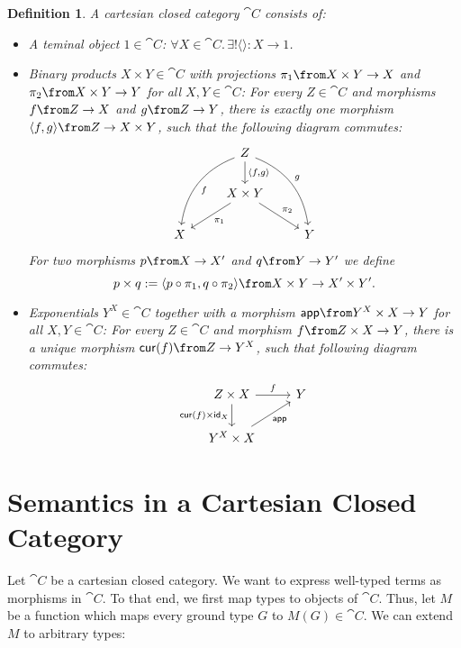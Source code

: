 \documentclass{article}
\newtheorem{defn}{Definition}[section]
\newcommand{\term}{1}
\newcommand{\app}{\mathsf{app}}
\newcommand{\cur}{\mathsf{cur}}
\newcommand{\id}{\mathsf{id}}
\begin{document}
\begin{defn}
    \label{def:ccc}
    A cartesian closed category $\cat{C}$ consists of:
    \begin{itemize}
        \item A teminal object $\term \in \cat{C}$: $\forall X \in \cat{C}.\, \exists! \langle\rangle: X \to \term$.
        \item Binary products $X \times Y \in \cat{C}$ with projections $\pi_1 \from X \times Y \to X$ and $\pi_2 \from X \times Y \to Y$
            for all $X, Y \in \cat{C}$:
            For every $Z \in \cat{C}$ and morphisms $f \from Z \to X$ and $g \from Z \to Y$,
            there is exactly one morphism $\langle f, g \rangle \from Z \to X \times Y$, such that the following diagram commutes:
            \[
                \begin{tikzcd}
                    & Z \arrow[bend right]{ddl}{f} \arrow{d}{\langle f, g \rangle} \arrow[bend left]{ddr}{g} & \\
                    & X \times Y \arrow{dl}{\pi_1} \arrow{dr}{\pi_2} & \\
                    X & & Y
                \end{tikzcd}
            \]
            For two morphisms $p \from X \to X'$ and $q \from Y \to Y'$ we define
            \[ p \times q := \langle p \circ \pi_1, q \circ \pi_2 \rangle \from X \times Y \to X' \times Y'.\]
        \item Exponentials $Y^X \in \cat{C}$ together with a morphism $\app \from Y^X \times X \to Y$ for all $X, Y \in \cat{C}$:
            For every $Z \in \cat{C}$ and morphism $f \from Z \times X \to Y$,
            there is a unique morphism $\cur(f) \from Z \to Y^X$, such that following diagram commutes:
            \[
                \begin{tikzcd}
                    Z \times X \arrow{d}[left]{\cur(f) \times \id_X} \arrow{r}{f} & Y \\
                    Y^X \times X \arrow{ur}[right=7pt, below]{\app}
                \end{tikzcd}
            \]
    \end{itemize}
\end{defn}


\section{Semantics in a Cartesian Closed Category}
\label{sec:sem}

Let $\cat{C}$ be a cartesian closed category.
We want to express well-typed terms as morphisms in $\cat{C}$.
To that end, we first map types to objects of $\cat{C}$.
Thus, let $M$ be a function which maps every ground type $G$ to $M(G) \in \cat{C}$.
We can extend $M$ to arbitrary types:
\end{document}
